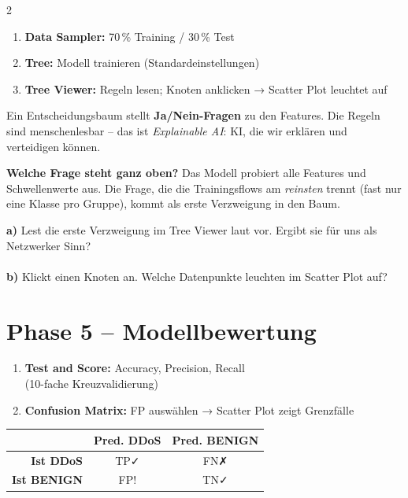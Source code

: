 \documentclass[a4paper, 10pt]{article}
\newcommand{\uebung}[2]{%
  \begin{tcolorbox}[uebstyle, title={Übung #1}]%
  \small #2%
  \end{tcolorbox}%
}
\begin{document}
\begin{multicols}{2}
\begin{enumerate}[start=4]
\item \textbf{Data Sampler:} 70\,\% Training / 30\,\% Test
\item \textbf{Tree:} Modell trainieren (Standardeinstellungen)
\item \textbf{Tree Viewer:} Regeln lesen;
      Knoten anklicken → Scatter Plot leuchtet auf
\end{enumerate}

\smallskip
Ein Entscheidungsbaum stellt \textbf{Ja/Nein-Fragen} zu den Features.
Die Regeln sind menschenlesbar –
das ist \emph{Explainable AI}: KI, die wir erklären und verteidigen können.

\smallskip
\textbf{Welche Frage steht ganz oben?}
Das Modell probiert alle Features und Schwellenwerte aus.
Die Frage, die die Trainingsflows am \emph{reinsten} trennt
(fast nur eine Klasse pro Gruppe), kommt als erste Verzweigung in den Baum.

\uebung{3}{%
  \textbf{a)} Lest die erste Verzweigung im Tree Viewer laut vor.
  Ergibt sie für uns als Netzwerker Sinn?\\[8pt]
  \dotfill\\[6pt]
  \textbf{b)} Klickt einen Knoten an.
  Welche Datenpunkte leuchten im Scatter Plot auf?\\[8pt]
  \dotfill
}

\section{Phase 5 – Modellbewertung}

\begin{enumerate}[start=7]
\item \textbf{Test and Score:}
      Accuracy, Precision, Recall\\
      (10-fache Kreuzvalidierung)
\item \textbf{Confusion Matrix:}
      FP auswählen → Scatter Plot zeigt Grenzfälle
\end{enumerate}

\smallskip
\begin{tabularx}{\linewidth}{@{}rcc@{}}
\toprule
& \textbf{Pred. DDoS} & \textbf{Pred. BENIGN}\\
\midrule
\textbf{Ist DDoS} & TP\;✓ & FN\;✗\\
\textbf{Ist BENIGN} & FP\;! & TN\;✓\\
\bottomrule
\end{tabularx}


\end{multicols}
\end{document}
